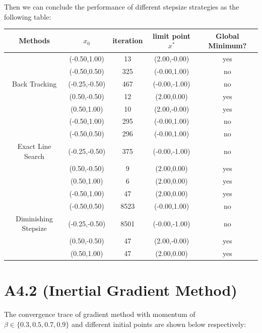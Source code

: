 \documentclass{article}
\newcommand{\secs}[1]{\section*{#1}}
\begin{document}
\endgroup

\newpage
Then we can conclude the performance of different stepsize strategies as the following table:

  \begin{center}
    \begin{tabular}{|c|cccc|} 
        \hline
        Methods & $x_0$ & iteration & limit point $x^*$ & Global Minimum?\\
        \hline
        &(-0.50,1.00) & 13 & (2.00,-0.00) & yes\\ %
        &(-0.50,0.50) & 325 & (-0.00,1.00) & no \\ %
        Back Tracking&(-0.25,-0.50) & 467 & (-0.00,-1.00) & no \\ %
        &(0.50,-0.50) & 12 & (2.00,0.00) & yes \\ %
        &(0.50,1.00) & 10 & (2.00,-0.00) & yes \\ %
        \hline
        \hline
        &(-0.50,1.00) & 295 & (-0.00,1.00) & no \\ %
        &(-0.50,0.50) & 296 & (-0.00,1.00) & no \\ %
        Exact Line Search&(-0.25,-0.50) & 375 & (-0.00,-1.00) & no \\ %
        &(0.50,-0.50) & 9 & (2.00,0.00) & yes \\ %
        &(0.50,1.00) & 6 & (2.00,0.00) & yes \\ %
        \hline
        \hline
        &(-0.50,1.00) & 47 & (2.00,0.00) & yes\\ %
        &(-0.50,0.50) & 8523 & (-0.00,1.00) & no \\ %
        Diminishing Stepsize&(-0.25,-0.50) & 8501 & (-0.00,-1.00) & no \\ %
        &(0.50,-0.50) & 47 & (2.00,-0.00) & yes\\ %
        &(0.50,1.00) & 47 & (2.00,0.00) & yes \\ %
      \hline
    \end{tabular} 
\end{center}
\newpage

\secs{A4.2 (Inertial Gradient Method)}

\noindent The convergence trace of gradient method with momentum of $\beta \in \{0.3,0.5,0.7,0.9\}$ and different initial points are shown below respectively:\\
\vspace{5mm}
\end{document}
